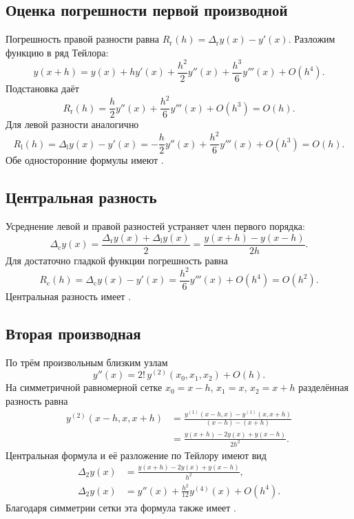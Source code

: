 \documentclass[../final.tex]{subfiles}
\begin{document}
\subsection{Оценка погрешности первой производной}

Погрешность правой разности равна $R_{\mathrm r}(h)=
\Delta_{\mathrm r}y(x)-y'(x)$. Разложим функцию в ряд Тейлора:
\begin{equation*}
    y(x+h)=y(x)+hy'(x)+\frac{h^2}{2}y''(x)
    +\frac{h^3}{6}y'''(x)+O(h^4).
\end{equation*}
Подстановка даёт
\begin{equation*}
    R_{\mathrm r}(h)
    =\frac h2y''(x)+\frac{h^2}{6}y'''(x)+O(h^3)=O(h).
\end{equation*}
Для левой разности аналогично
\begin{equation*}
    R_{\mathrm l}(h)=\Delta_{\mathrm l}y(x)-y'(x)
    =-\frac h2y''(x)+\frac{h^2}{6}y'''(x)+O(h^3)=O(h).
\end{equation*}
Обе односторонние формулы имеют .

\subsection{Центральная разность}

Усреднение левой и правой разностей устраняет член первого порядка:
\begin{equation*}
    \Delta_{\mathrm c}y(x)
    =\frac{\Delta_{\mathrm r}y(x)+\Delta_{\mathrm l}y(x)}2
    =\frac{y(x+h)-y(x-h)}{2h}.
\end{equation*}
Для достаточно гладкой функции погрешность равна
\begin{equation*}
    R_{\mathrm c}(h)=\Delta_{\mathrm c}y(x)-y'(x)
    =\frac{h^2}{6}y'''(x)+O(h^4)=O(h^2).
\end{equation*}
Центральная разность имеет .

\subsection{Вторая производная}

По трём произвольным близким узлам
\begin{equation*}
    y''(x)=2!\,y^{(2)}(x_0,x_1,x_2)+O(h).
\end{equation*}
На симметричной равномерной сетке $x_0=x-h$, $x_1=x$, $x_2=x+h$
разделённая разность равна
\begin{align*}
    y^{(2)}(x-h,x,x+h)
    &=\frac{y^{(1)}(x-h,x)-y^{(1)}(x,x+h)}{(x-h)-(x+h)}\\
    &=\frac{y(x+h)-2y(x)+y(x-h)}{2h^2}.
\end{align*}
Центральная формула и её разложение по Тейлору имеют вид
\begin{align*}
    \Delta_2y(x)&=\frac{y(x+h)-2y(x)+y(x-h)}{h^2},\\
    \Delta_2y(x)&=y''(x)+\frac{h^2}{12}y^{(4)}(x)+O(h^4).
\end{align*}
Благодаря симметрии сетки эта формула также имеет
.
\end{document}
